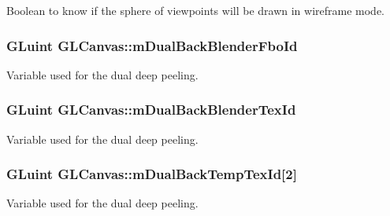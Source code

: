 Boolean to know if the sphere of viewpoints will be drawn in wireframe mode. 

\hypertarget{class_g_l_canvas_a6e92661f8370a1ad77b1b41cd28ea70d}{
\subsubsection[{m\+Dual\+Back\+Blender\+Fbo\+Id}]{\setlength{\rightskip}{0pt plus 5cm}G\+Luint G\+L\+Canvas\+::m\+Dual\+Back\+Blender\+Fbo\+Id\hspace{0.3cm}{\ttfamily [private]}}}\label{class_g_l_canvas_a6e92661f8370a1ad77b1b41cd28ea70d}


Variable used for the dual deep peeling. 

\hypertarget{class_g_l_canvas_a5a1a479531bb816695f56bad28d3e7c8}{
\subsubsection[{m\+Dual\+Back\+Blender\+Tex\+Id}]{\setlength{\rightskip}{0pt plus 5cm}G\+Luint G\+L\+Canvas\+::m\+Dual\+Back\+Blender\+Tex\+Id\hspace{0.3cm}{\ttfamily [private]}}}\label{class_g_l_canvas_a5a1a479531bb816695f56bad28d3e7c8}


Variable used for the dual deep peeling. 

\hypertarget{class_g_l_canvas_a084bdb1e6147fdec4b6cea40d1cd88ba}{
\subsubsection[{m\+Dual\+Back\+Temp\+Tex\+Id}]{\setlength{\rightskip}{0pt plus 5cm}G\+Luint G\+L\+Canvas\+::m\+Dual\+Back\+Temp\+Tex\+Id\mbox{[}2\mbox{]}\hspace{0.3cm}{\ttfamily [private]}}}\label{class_g_l_canvas_a084bdb1e6147fdec4b6cea40d1cd88ba}


Variable used for the dual deep peeling. 

